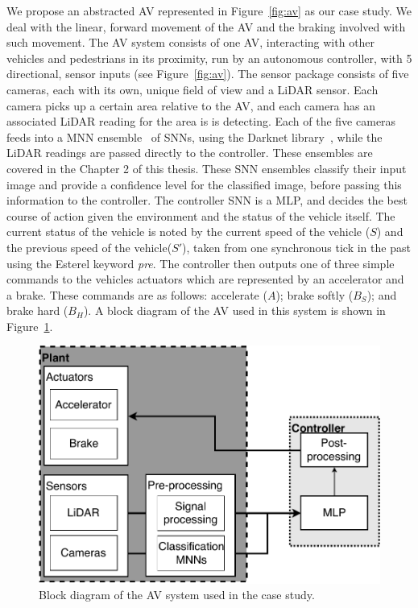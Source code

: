 We propose an abstracted \acf{AV} represented in Figure~\ref{fig:av} as our case study.
We deal with the linear, forward movement of the \ac{AV} and the braking involved with such movement.
The \ac{AV} system consists of one \acf{AV}, interacting with other vehicles and pedestrians in its proximity, run by an autonomous controller, with 5 directional, sensor inputs (see Figure~\ref{fig:av}).
The sensor package consists of five cameras, each with its own, unique field of view and a \acf{LiDAR} sensor.
Each camera picks up a certain area relative to the \ac{AV}, and each camera has an associated \ac{LiDAR} reading for the area is is detecting.
Each of the five cameras feeds into a \acf{MNN} ensemble~\cite{Maqsood2004} of \acp{SNN}, using the Darknet library~\cite{darknet13}, while the \ac{LiDAR} readings are passed directly to the controller.
These ensembles are covered in the Chapter 2 of this thesis.
These \ac{SNN} ensembles classify their input image and provide a confidence level for the classified image, before passing this information to the controller.
The controller \ac{SNN} is a \ac{MLP}, and decides the best course of action given the environment and the status of the vehicle itself. 
The current status of the vehicle is noted by the current speed of the vehicle ($S$) and the previous speed of the vehicle($S'$), taken from one synchronous tick in the past using the Esterel keyword \textit{pre}.
The controller then outputs one of three simple commands to the vehicles actuators which are represented by an accelerator and a brake.
These commands are as follows: accelerate ($A$); brake softly ($B_S$); and brake hard ($B_H$).
A block diagram of the \ac{AV} used in this system is shown in Figure~\ref{fig:avnenf}. 

\begin{figure}[h]
	\centering
	\includegraphics[scale=0.6]{Content/fig/AV-sys-nenf.pdf}
	\caption{Block diagram of the \ac{AV} system used in the case study. \label{fig:avnenf}}
\end{figure}

